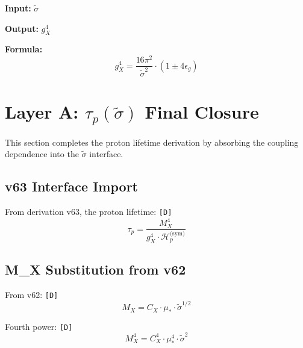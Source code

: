 \documentclass[11pt,a4paper]{article}
\newcommand{\tagD}{\textcolor{green!50!black}{\texttt{[D]}}}
\theoremstyle{definition}
\begin{document}
\begin{apibox}
\textbf{Input:} $\tilde{\sigma}$

\textbf{Output:} $g_X^4$

\textbf{Formula:}
\begin{equation}
\label{eq:api-gx2}
g_X^4 = \frac{16\pi^2}{\tilde{\sigma}^2} \cdot (1 \pm 4\epsilon_g)
\end{equation}
\end{apibox}

\section{Layer A: $\tau_p(\tilde{\sigma})$ Final Closure}
\label{sec:taup-closure}

\begin{interfacebox}
This section completes the proton lifetime derivation by absorbing the
coupling dependence into the $\tilde{\sigma}$ interface.
\end{interfacebox}

\subsection{v63 Interface Import}
\label{subsec:v63-import}

From derivation v63, the proton lifetime: \tagD{}
\begin{equation}
\label{eq:v63-import}
\tau_p = \frac{M_X^4}{g_X^4 \cdot \mathcal{H}_p^{\text{(sym)}}}
\end{equation}

\subsection{M\_X Substitution from v62}
\label{subsec:mx-subst}

From v62: \tagD{}
\begin{equation}
\label{eq:mx-v62-import}
M_X = C_X \cdot \mu_* \cdot \tilde{\sigma}^{1/2}
\end{equation}

Fourth power: \tagD{}
\begin{equation}
\label{eq:mx-fourth}
M_X^4 = C_X^4 \cdot \mu_*^4 \cdot \tilde{\sigma}^2
\end{equation}
\end{document}
